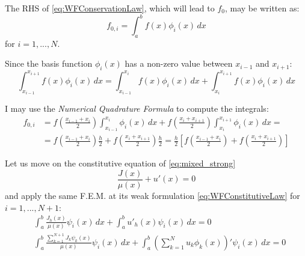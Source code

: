 \documentclass{article}
\begin{document}
The RHS of \eqref{eq:WFConservationLaw}, which will lead to $f_0$, may be written as:
\begin{equation*}
    f_{0,i} = \int_a^b f(x) \phi_i(x) \,  dx
\end{equation*}
for $i=1,...,N$.

Since the basis function $\phi_i(x)$ has a non-zero value between $x_{i-1}$ and $x_{i+1}$:
\begin{equation*}
    \int_{x_{i-1}}^{x_{i+1}} f(x) \phi_i(x) \,  dx = \int_{x_{i-1}}^{x_{i}} f(x) \phi_i(x) \,  dx + \int_{x_{i}}^{x_{i+1}} f(x) \phi_i(x) \,  dx 
\end{equation*}

I may use the \textit{Numerical Quadrature Formula} to compute the integrals:
\begin{align*}
    f_{0,i} & =  f\left( \frac{x_{i-1} + x_i }{2} \right) \int_{x_{i-1}}^{x_{i}} \phi_i(x) \,  dx  +  f\left( \frac{x_{i} + x_{i+1} }{2} \right) \int_{x_{i}}^{x_{i+1}} \phi_i(x) \,  dx = \\
     & = f\left( \frac{x_{i-1} + x_i }{2} \right) \frac{h}{2}  +  f\left( \frac{x_{i} + x_{i+1} }{2} \right) \frac{h}{2} = \frac{h}{2} \left[f\left( \frac{x_{i-1} + x_i }{2} \right) + f\left( \frac{x_{i} + x_{i+1} }{2} \right) \right]
\end{align*}



Let us move on the constitutive equation of \eqref{eq:mixed_strong} 
\begin{equation}
    \frac{J(x)}{\mu(x)} + u'(x) = 0
    \label{eq:Constitutive}
\end{equation}
and apply the same F.E.M. at its weak formulation \eqref{eq:WFConstitutiveLaw} for $i=1,...,N+1$: 
\begin{align*}
    &\int_a^b \frac{J_h(x)}{\mu(x)} \psi_i(x) \, dx+ \int_a^b u'_h(x) \psi_i(x) \, dx = 0 \\
    & \int_a^b \frac{\sum_{k=1}^{N+1} J_k \psi_k(x)}{\mu(x)} \psi_i(x) \, dx + \int_a^b \left(\sum_{k=1}^{N} u_k \phi_k(x)\right)' \psi_i(x) \, dx = 0
\end{align*}
\end{document}
